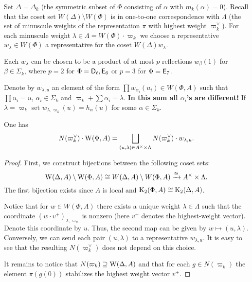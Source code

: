 Set $\Delta = \Delta_k$ (the symmetric subset of $\Phi$ consisting of $\alpha$ with $m_k(\alpha)=0$). Recall that the coset set $W(\Delta) \setminus W(\Phi)$ is in one-to-one correspondence with $\Lambda$ (the set of minuscule weights of the representation $\pi$ with highest weight $\varpi_k^\vee$). For each minuscule weight $\lambda \in \Lambda = W(\Phi)\cdot \varpi_k$ we choose a representative $w_\lambda \in W(\Phi)$ a representative for the coset $W(\Delta) w_\lambda$.


\begin{rem} Each $w_\lambda$ can be chosen to be a product of at most $p$ reflections $w_\beta(1)$ for $\beta\in\Sigma_k$, where $p = 2$ for $\Phi = \mathsf{D}_\ell, \mathsf{E}_6$ or $p = 3$ for $\Phi = \mathsf{E}_7$. \end{rem}

Denote by $w_{\lambda, u}$ an element of the form $\prod w_{\alpha_i}(u_i) \in W(\Phi, A)$ such that $\prod u_i = u$, $\alpha_i \in \Sigma_k$ and $\varpi_k + \sum \alpha_i = \lambda$.
{\bf In this sum all $\alpha_i$'s are different!}
If $\lambda = \varpi_k$ set $w_{\lambda, \varpi_k}(u) = h_\alpha(u)$ for some $\alpha \in \Sigma_k$.


\begin{lemma} \label{lem:can-repr} One has \[N(\varpi_k^\vee) \cdot \operatorname{W}(\Phi, A) = \bigsqcup\limits_{(u, \lambda) \in A^\times \times \Lambda} N(\varpi_k^\vee) \cdot w_{\lambda, u}. \]
\end{lemma}
\begin{proof}
 First, we construct bijections between the following coset sets:
 \begin{equation}\label{eq:repr} \operatorname{W}(\Delta, A) \setminus \operatorname{W}(\Phi, A) \cong W(\Delta, A) \setminus W(\Phi, A) \xrightarrow{\cong} A^\times \times \Lambda.\end{equation}
 The first bijection exists since $A$ is local and $\operatorname{K}_2(\Phi, A) \cong \operatorname{K}_2(\Delta, A)$.

 Notice that for $w \in W(\Phi, A)$ there exists a unique weight $\lambda \in \Lambda$ such that the coordinate $(w \cdot v^+)_{\lambda, \varpi_k}$ is nonzero (here $v^+$ denotes the highest-weight vector). Denote this coordinate by $u$. Thus, the second map can be given by $w \mapsto (u, \lambda)$. Conversely, we can send each pair $(u, \lambda)$ to a representative $w_{\lambda, u}$. It is easy to see that the resulting $N(\varpi_k^\vee)$ does not depend on this choice.


 It remains to notice that $N(\varpi_k) \supseteq \operatorname{W}(\Delta, A)$ and that for each $g \in N(\varpi_k)$ the element $\pi(g(0))$ stabilizes the highest weight vector $v^+$.
\end{proof}


